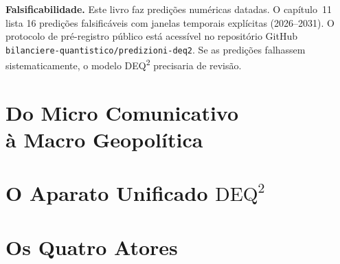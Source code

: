 \documentclass[12pt, twoside]{book}
\theoremstyle{plain}
\theoremstyle{definition}
\theoremstyle{remark}
\newcommand{\deq}{\mathrm{DEQ}^2}
\begin{document}
\textbf{Falsificabilidade.}
Este livro faz predi\c{c}\~{o}es num\'{e}ricas datadas. O cap\'{i}tulo~11 lista 16 predi\c{c}\~{o}es falsific\'{a}veis com janelas temporais expl\'{i}citas (2026--2031). O protocolo de pr\'{e}-registro p\'{u}blico est\'{a} acess\'{i}vel no reposit\'{o}rio GitHub \texttt{bilanciere-quantistico/predizioni-deq2}. Se as predi\c{c}\~{o}es falhassem sistematicamente, o modelo DEQ\textsuperscript{2} precisaria de revis\~{a}o.

\cleardoublepage
{}

\part[Do Micro Comunicativo \`{a} Macro Geopol\'{i}tica]{Do Micro Comunicativo\\\`{a} Macro Geopol\'{i}tica}





\part{O Aparato Unificado \texorpdfstring{$\deq$}{DEQ²}}




\part{Os Quatro Atores}






\end{document}

